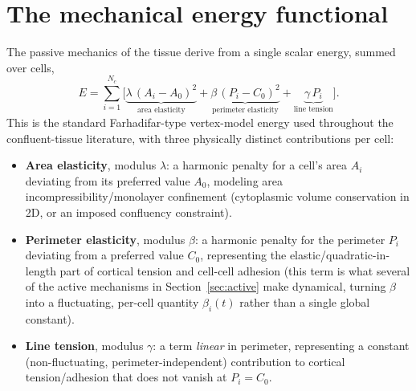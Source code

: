 \documentclass[11pt]{article}
\begin{document}
\section{The mechanical energy functional}
\label{sec:energy}

The passive mechanics of the tissue derive from a single scalar energy, summed over
cells,
\begin{equation}
  E = \sum_{i=1}^{N_c} \Big[
      \underbrace{\lambda\,(A_i - A_0)^2}_{\text{area elasticity}}
    + \underbrace{\beta\,(P_i - C_0)^2}_{\text{perimeter elasticity}}
    + \underbrace{\gamma\,P_i}_{\text{line tension}}
  \Big].
  \label{eq:energy}
\end{equation}
This is the standard Farhadifar-type vertex-model energy used throughout the
confluent-tissue literature, with three physically distinct contributions per cell:

\begin{itemize}
  \item \textbf{Area elasticity}, modulus $\lambda$: a harmonic penalty for a cell's
  area $A_i$ deviating from its preferred value $A_0$, modeling area
  incompressibility/monolayer confinement (cytoplasmic volume conservation in 2D, or an
  imposed confluency constraint).
  \item \textbf{Perimeter elasticity}, modulus $\beta$: a harmonic penalty for the
  perimeter $P_i$ deviating from a preferred value $C_0$, representing the
  elastic/quadratic-in-length part of cortical tension and cell-cell adhesion (this
  term is what several of the active mechanisms in Section~\ref{sec:active} make
  dynamical, turning $\beta$ into a fluctuating, per-cell quantity $\beta_i(t)$ rather
  than a single global constant).
  \item \textbf{Line tension}, modulus $\gamma$: a term \emph{linear} in perimeter,
  representing a constant (non-fluctuating, perimeter-independent) contribution to
  cortical tension/adhesion that does not vanish at $P_i=C_0$.
\end{itemize}
\end{document}
